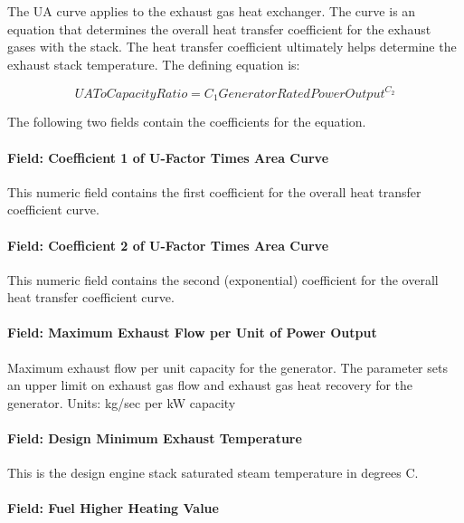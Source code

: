 The UA curve applies to the exhaust gas heat exchanger. The curve is an equation that determines the overall heat transfer coefficient for the exhaust gases with the stack. The heat transfer coefficient ultimately helps determine the exhaust stack temperature. The defining equation is:

\begin{equation}
UAToCapacityRatio = {C_1}GeneratorRatedPowerOutpu{t^{{C_2}}}
\end{equation}

The following two fields contain the coefficients for the equation.

\paragraph{Field: Coefficient 1 of U-Factor Times Area Curve}\label{field-coefficient-1-of-u-factor-times-area-curve}

This numeric field contains the first coefficient for the overall heat transfer coefficient curve.

\paragraph{Field: Coefficient 2 of U-Factor Times Area Curve}\label{field-coefficient-2-of-u-factor-times-area-curve}

This numeric field contains the second (exponential) coefficient for the overall heat transfer coefficient curve.

\paragraph{Field: Maximum Exhaust Flow per Unit of Power Output}\label{field-maximum-exhaust-flow-per-unit-of-power-output}

Maximum exhaust flow per unit capacity for the generator. The parameter sets an upper limit on exhaust gas flow and exhaust gas heat recovery for the generator. Units: kg/sec per kW capacity

\paragraph{Field: Design Minimum Exhaust Temperature}\label{field-design-minimum-exhaust-temperature}

This is the design engine stack saturated steam temperature in degrees C.

\paragraph{Field: Fuel Higher Heating Value}\label{field-fuel-higher-heating-value}

